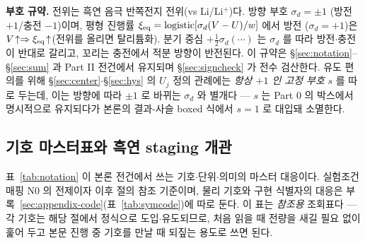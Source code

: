\textbf{부호 규약.} 전위는 흑연 음극 반쪽전지 전위(vs Li/Li$^+$)다. 방향 부호 $\sigma_d=\pm1$
(방전 $+1$/충전 $-1$)이며, 평형 진행률 $\xi_{\mathrm{eq}}=\mathrm{logistic}[\sigma_d(V-U)/w]$ 에서 방전
($\sigma_d=+1$)은 $V\!\uparrow\Rightarrow\xi_{\mathrm{eq}}\!\uparrow$(전위를 올리면 탈리튬화). 분기 중심 $+\tfrac12\sigma_d(\cdots)$
는 $\sigma_d$ 를 따라 방전$\cdot$충전이 반대로 갈리고, 꼬리는 충전에서 적분 방향이 반전된다. 이 규약은 \S\ref{sec:notation}--\S\ref{sec:sum}
과 Part II 전건에서 유지되며 \S\ref{sec:signcheck} 가 전수 검산한다. 유도 편의를 위해 \S\ref{sec:center}$\cdot$\S\ref{sec:hys}
의 $U_j$ 정의 관례에는 \emph{항상 $+1$ 인 고정 부호} $s$ 를 따로 두는데, 이는 방향에 따라 $\pm1$ 로 바뀌는 $\sigma_d$ 와
별개다 --- $s$ 는 Part 0 의 박스에서 명시적으로 유지되다가 본론의 결과-사슬 boxed 식에서 $s{=}1$ 로 대입돼 소멸한다.

\subsection{기호 마스터표와 흑연 staging 개관}\label{sec:notation-table}
표~\ref{tab:notation} 이 본론 전건에서 쓰는 기호$\cdot$단위$\cdot$의미의 마스터 대응이다. 실험조건 매핑 $\mathrm N0$
의 전제이자 이후 절의 참조 기준이며, 물리 기호와 구현 식별자의 대응은 부록~\ref{sec:appendix-code}(표~\ref{tab:symcode})에 따로 둔다.
이 표는 \emph{참조용} 조회표다 --- 각 기호는 해당 절에서 정식으로 도입$\cdot$유도되므로, 처음 읽을 때
전량을 새길 필요 없이 훑어 두고 본문 진행 중 기호를 만날 때 되짚는 용도로 쓰면 된다.

